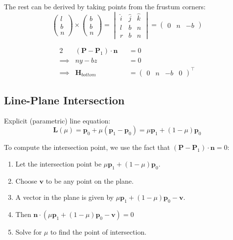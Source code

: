 \documentclass[11pt]{article}
\begin{document}
The rest can be derived by taking points from the frustum corners:
\[
  \begin{pmatrix} l \\ b \\ n \end{pmatrix}
  \times
  \begin{pmatrix} b \\ b \\ n \end{pmatrix}
  =
  \begin{vmatrix}
    \hat{i} & \hat{j} & \hat{k} \\
    l & b & n \\
    r & b & n
  \end{vmatrix}
  =
  \begin{pmatrix} 0 & n & -b \end{pmatrix}
\]

\begin{alignat*}{2}
  \quad & (\textbf{P} - \textbf{P}_1) \cdot \textbf{n} &&= 0 \\
  \implies & ny - bz &&= 0 \\
  \implies & \textbf{H}_{bottom} &&= \begin{pmatrix} 0 & n & -b & 0 \end{pmatrix}^\intercal
\end{alignat*}

\subsection{Line-Plane Intersection}
Explicit (parametric) line equation:
\[
  \textbf{L}(\mu) = \textbf{p}_0 + \mu(\textbf{p}_1 - \textbf{p}_0) = \mu \textbf{p}_1 + (1 - \mu) \textbf{p}_0
\]

To compute the intersection point, we use the fact that $(\textbf{P} - \textbf{P}_1) \cdot \textbf{n} = 0$:
\begin{enumerate}
  \item Let the intersection point be $\mu \textbf{p}_1 + (1 - \mu) \textbf{p}_0$.
  \item Choose $\textbf{v}$ to be any point on the plane.
  \item A vector in the plane is given by $\mu \textbf{p}_1 + (1 - \mu) \textbf{p}_0 - \textbf{v}$.
  \item Then $\textbf{n} \cdot (\mu \textbf{p}_1 + (1 - \mu) \textbf{p}_0 - \textbf{v}) = 0$
  \item Solve for $\mu$ to find the point of intersection.
\end{enumerate}
\end{document}
